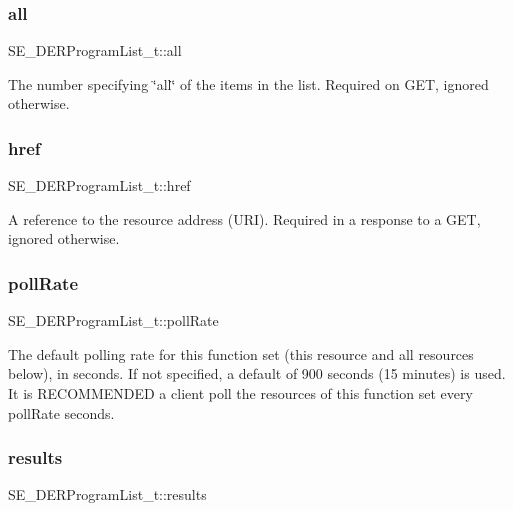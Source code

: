 \subsubsection{\texorpdfstring{all}{all}}
{\footnotesize\ttfamily S\+E\+\_\+\+D\+E\+R\+Program\+List\+\_\+t\+::all}

The number specifying \char`\"{}all\char`\"{} of the items in the list. Required on G\+ET, ignored otherwise. \mbox{\label{group__DERProgramList_gad8fa23267d2231b0402935da3ac7ef59}} 
\subsubsection{\texorpdfstring{href}{href}}
{\footnotesize\ttfamily S\+E\+\_\+\+D\+E\+R\+Program\+List\+\_\+t\+::href}

A reference to the resource address (U\+RI). Required in a response to a G\+ET, ignored otherwise. \mbox{\label{group__DERProgramList_gaad6d0952e709c97938d369ddb2da093f}} 
\subsubsection{\texorpdfstring{poll\+Rate}{pollRate}}
{\footnotesize\ttfamily S\+E\+\_\+\+D\+E\+R\+Program\+List\+\_\+t\+::poll\+Rate}

The default polling rate for this function set (this resource and all resources below), in seconds. If not specified, a default of 900 seconds (15 minutes) is used. It is R\+E\+C\+O\+M\+M\+E\+N\+D\+ED a client poll the resources of this function set every poll\+Rate seconds. \mbox{\label{group__DERProgramList_gaef78d7616581dd0227f68b61f00a2c02}} 
\subsubsection{\texorpdfstring{results}{results}}
{\footnotesize\ttfamily S\+E\+\_\+\+D\+E\+R\+Program\+List\+\_\+t\+::results}

